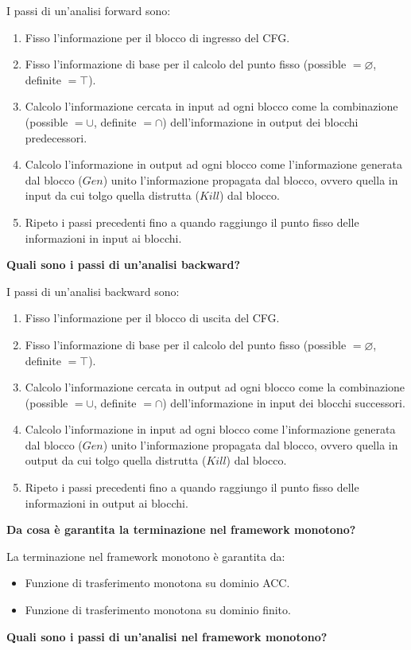 \documentclass[a4paper,oneside,titlepage]{book}
\begin{document}
I passi di un'analisi forward sono:
\begin{enumerate}
    \item Fisso l'informazione per il blocco di ingresso del CFG.
    \item Fisso l'informazione di base per il calcolo del punto fisso (possible $= \varnothing$, definite $= \top$).
    \item Calcolo l'informazione cercata in input ad ogni blocco come la combinazione (possible $= \cup$, definite $= \cap$) dell'informazione in output dei blocchi predecessori.
    \item Calcolo l'informazione in output ad ogni blocco come l'informazione generata dal blocco ($Gen$) unito l'informazione propagata dal blocco, ovvero quella in input da cui tolgo quella distrutta ($Kill$) dal blocco.
    \item Ripeto i passi precedenti fino a quando raggiungo il punto fisso delle informazioni in input ai blocchi.
\end{enumerate}
\noindent
\textbf{Quali sono i passi di un'analisi backward?}

I passi di un'analisi backward sono:
\begin{enumerate}
    \item Fisso l'informazione per il blocco di uscita del CFG.
    \item Fisso l'informazione di base per il calcolo del punto fisso (possible $= \varnothing$, definite $= \top$).
    \item Calcolo l'informazione cercata in output ad ogni blocco come la combinazione (possible $= \cup$, definite $= \cap$) dell'informazione in input dei blocchi successori.
    \item Calcolo l'informazione in input ad ogni blocco come l'informazione generata dal blocco ($Gen$) unito l'informazione propagata dal blocco, ovvero quella in output da cui tolgo quella distrutta ($Kill$) dal blocco.
    \item Ripeto i passi precedenti fino a quando raggiungo il punto fisso delle informazioni in output ai blocchi.
\end{enumerate}
\noindent
\textbf{Da cosa è garantita la terminazione nel framework monotono?}

La terminazione nel framework monotono è garantita da:
\begin{itemize}
    \item Funzione di trasferimento monotona su dominio ACC.
    \item Funzione di trasferimento monotona su dominio finito.
\end{itemize}
\newpage
\noindent
\textbf{Quali sono i passi di un'analisi nel framework monotono?}
\end{document}
